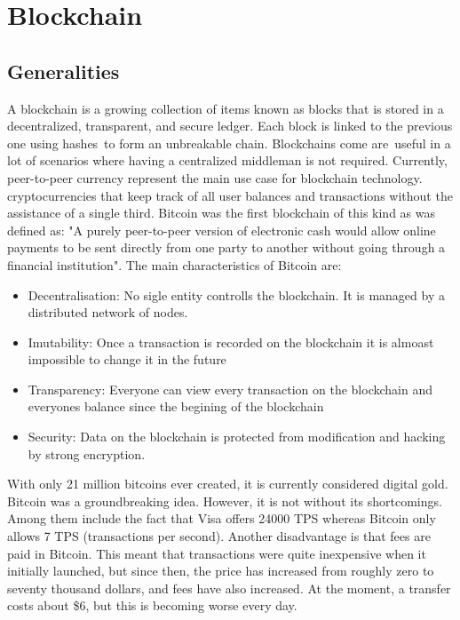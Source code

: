 \chapter{Blockchain}

\section{Generalities}
\label{sec:ch2sec1}
A blockchain is a growing collection of items known as blocks that is stored in a decentralized, transparent, and secure ledger. Each block is linked to the previous one using hashes to form an unbreakable chain. Blockchains come are useful in a lot of scenarios where having a centralized middleman is not required. Currently, peer-to-peer currency represent the main use case for blockchain technology. cryptocurrencies that keep track of all user balances and transactions without the assistance of a single third. Bitcoin was the first blockchain of this kind as was defined as: "A purely peer-to-peer version of electronic cash would allow online payments to be sent directly from one party to another without going through a financial institution"\cite{nakamoto2008bitcoin}. The main characteristics of Bitcoin are:
\begin{itemize}
	\item Decentralisation: No sigle entity controlls the blockchain. It is managed by a distributed network of nodes.
	\item Imutability: Once a transaction is recorded on the blockchain it is almoast impossible to change it in the future
	\item Transparency: Everyone can view every transaction on the blockchain and everyones balance since the begining of the blockchain
	\item Security: Data on the blockchain is protected from modification and hacking by strong encryption.
\end{itemize}
\par With only 21 million bitcoins ever created, it is currently considered digital gold. Bitcoin was a groundbreaking idea. However, it is not without its shortcomings. Among them include the fact that Visa offers 24000 TPS whereas Bitcoin only allows 7 TPS (transactions per second). Another disadvantage is that fees are paid in Bitcoin. This meant that transactions were quite inexpensive when it initially launched, but since then, the price has increased from roughly zero to seventy thousand dollars, and fees have also increased. At the moment, a transfer costs about \$6, but this is becoming worse every day.
